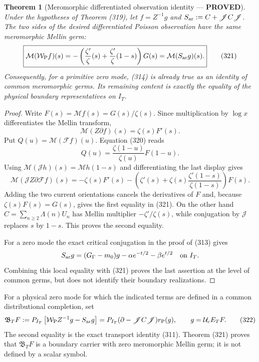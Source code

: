 \documentclass[11pt]{article}
\newtheorem{theorem}{Theorem}
\newcommand{\PROVED}{\textcolor{green!45!black}{\textbf{PROVED}}}
\begin{document}
\begin{theorem}[Meromorphic differentiated observation identity --- \PROVED]
Under the hypotheses of Theorem (319), let $f=Z^{-1}g$ and
$S_{\rm ar}:=C+\mathscr JC\mathscr J$.  The two sides of the desired
differentiated Poisson observation have the same meromorphic Mellin germ:
\begin{equation}
 \boxed{
 \mathcal M(\mathcal W_{\rm P}f)(s)
 =-\left(
       \frac{\zeta'}{\zeta}(s)
       +\frac{\zeta'}{\zeta}(1-s)
    \right)G(s)
 =\mathcal M(S_{\rm ar}g)(s).}                       \tag{321}
\end{equation}
Consequently, for a primitive zero mode, (314) is already true as an
identity of common meromorphic germs.  Its remaining content is exactly the
equality of the physical boundary representatives on $I_T$.
\end{theorem}

\begin{proof}
Write $F(s)=\mathcal Mf(s)=G(s)/\zeta(s)$.  Since multiplication by
$\log x$ differentiates the Mellin transform,
\[
 \mathcal M(Z\partial f)(s)=\zeta(s)F'(s).
\]
Put $Q(u)=\mathcal M(\mathcal Ff)(u)$.  Equation (320) reads
\[
 Q(u)=\frac{\zeta(1-u)}{\zeta(u)}F(1-u).
\]
Using $\mathcal M(\mathscr Jh)(s)=\mathcal Mh(1-s)$ and differentiating
the last display gives
\[
 \mathcal M(\mathscr JZ\partial\mathcal Ff)(s)
 =-\zeta(s)F'(s)
  -\left(\zeta'(s)
        +\zeta(s)\frac{\zeta'(1-s)}{\zeta(1-s)}\right)F(s).
\]
Adding the two current orientations cancels the derivatives of $F$ and,
because $\zeta(s)F(s)=G(s)$, gives the first equality in (321).
On the other hand $C=\sum_{n\ge2}\Lambda(n)U_n$ has Mellin multiplier
$-\zeta'/\zeta(s)$, while conjugation by $\mathscr J$ replaces $s$ by
$1-s$.  This proves the second equality.

For a zero mode the exact critical conjugation in the proof of (313) gives
\[
 S_{\rm ar}g=(G_\Gamma-m_0)g
       -\alpha e^{-t/2}-\beta e^{t/2}\quad\hbox{on }I_T.
\]
Combining this local equality with (321) proves the last assertion at the
level of common germs, but does not identify their boundary realizations.
\end{proof}

\begin{definition}
For a physical zero mode for which the indicated terms are defined in a
common distributional completion, set
\begin{equation}
 \mathfrak B_TF
 :=P_{I_T}\left[
   \mathcal W_{\rm P}Z^{-1}g-S_{\rm ar}g\right]
 =P_{I_T}(\partial-\mathscr JC\mathscr J)r_{\rm P}(g),
 \qquad g=\mathcal U_cE_TF.                           \tag{322}
\end{equation}
The second equality is the exact transport identity (311).  Theorem (321)
proves that $\mathfrak B_TF$ is a boundary carrier with zero meromorphic
Mellin germ; it is not defined by a scalar symbol.
\end{definition}
\end{document}
